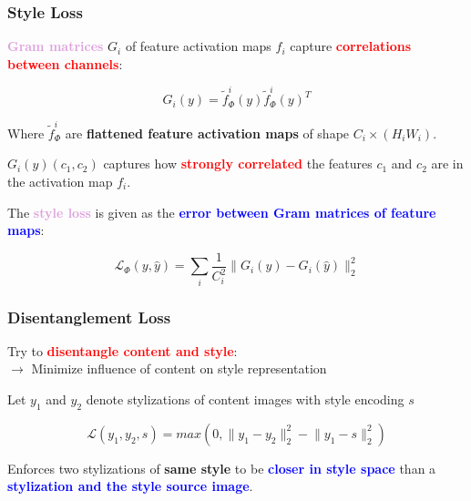 \documentclass[11pt,xcolor=dvipsnames]{beamer}
\begin{document}
\begin{frame}
	\frametitle{Style Loss}

\textbf{\textcolor{Plum}{Gram matrices}} $G_i$ of feature activation maps  $f_i$ capture \textbf{\textcolor{red}{correlations between channels}}:

\begin{equation*}
	G_i(y) = \tilde{f}_{\Phi}^i(y) \tilde{f}_{\Phi}^i(y)^T
\end{equation*}

Where $\tilde{f}^i_{\Phi}$ are \textbf{flattened feature activation maps} of shape $C_i \times (H_i W_i)$.
\vspace{10pt}

$G_i(y)(c_1, c_2)$ captures how \textcolor{red}{\textbf{strongly correlated}} the features $c_1$ and $c_2$ are in the activation map $f_i$.

\vspace{10pt}	
	
The \textbf{\textcolor{Plum}{style loss}} is given as the \textbf{\textcolor{blue}{error between Gram matrices of feature maps}}:

\begin{equation*}
	\mathcal{L}_{\Phi}(y, \hat{y}) = \sum_i \frac{1}{C_i^2} \lVert G_i(y) - G_i(\hat{y}) \rVert^2_2
\end{equation*}
	
\end{frame}

\begin{frame}
	\frametitle{Disentanglement Loss}


Try to \textbf{\textcolor{red}{disentangle content and style}}:\\
$\rightarrow$ Minimize influence of content on style representation \cite{disentanglement}

\vspace{10pt}

Let $y_1$ and $y_2$ denote stylizations of content images with style encoding $s$

\begin{equation}
	\mathcal{L}(y_1, y_2, s) = max(0, \lVert y_1 - y_2 \rVert^2_2 - \lVert y_1 - s \rVert^2_2)
\end{equation}

Enforces two stylizations of \textbf{same style} to be \textbf{\textcolor{blue}{closer in style space}} than a \textbf{\textcolor{blue}{stylization and the style source image}}.
	
\end{frame}
\end{document}
